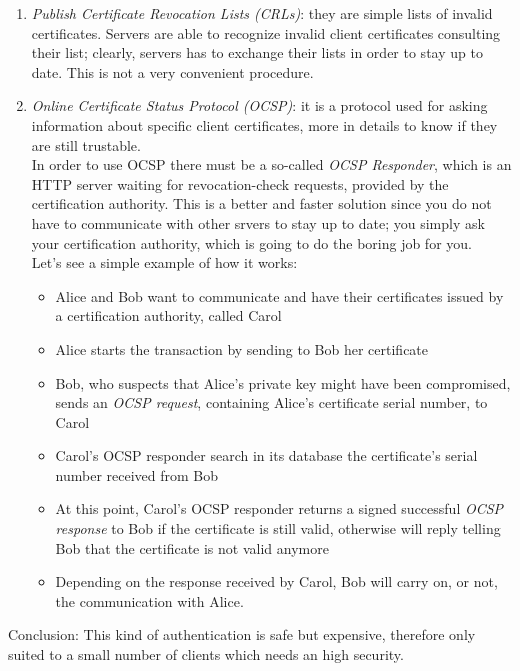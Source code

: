 \documentclass[12pt]{report}
\begin{document}
{\begin{itemize}
\begin{itemize}
\begin{enumerate}
\item \emph{Publish Certificate Revocation Lists (CRLs)}: they are simple lists of invalid certificates.
Servers are able to recognize invalid client certificates consulting their list; clearly, servers has to exchange their lists in order to stay up to date. This is not a very convenient procedure.
\item \emph{Online Certificate Status Protocol (OCSP)}:  it is a protocol used for asking information about specific client certificates, more in details to know if they are still trustable.\\
In order to use OCSP there must be a so-called \emph{OCSP Responder}, which is an HTTP server waiting for revocation-check requests, provided by the certification authority.
This is a better and faster solution since you do not have to communicate with other srvers to stay up to date; you simply ask your certification authority, which is going to do the boring job for you.\\
Let's see a simple example of how it works:

\begin{itemize}
\item Alice and Bob want to communicate and have their certificates issued by a certification authority, called Carol
\item Alice starts the transaction by sending to Bob her certificate
\item Bob, who suspects that Alice's private key might have been compromised, sends an \emph{OCSP request}, containing Alice's certificate serial number, to Carol
\item Carol's OCSP responder search in its database the certificate's serial number received from Bob
\item At this point, Carol's OCSP responder returns a signed successful \emph{OCSP response} to Bob if the certificate is still valid, otherwise will reply telling Bob that the certificate is not valid anymore
\item Depending on the response received by Carol, Bob will carry on, or not, the communication with Alice.\\
\end{itemize}


\end{enumerate}
\end{itemize}
\end{itemize}


Conclusion: This kind of authentication is safe but expensive, therefore only suited to a small number of clients which needs an high security. \\

}
\end{document}

